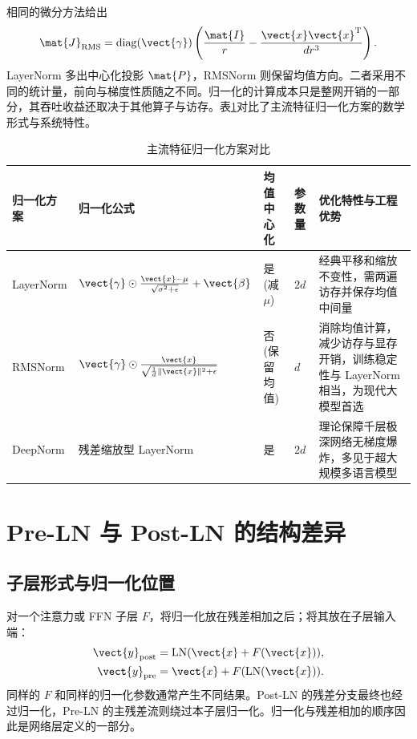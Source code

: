 \documentclass[../textbook.tex]{subfiles}
\begin{document}
相同的微分方法给出
\begin{equation}
 \mat{J}_{\mathrm{RMS}}=\operatorname{diag}(\vect{\gamma})
 \left(\frac{\mat{I}}r-\frac{\vect{x}\vect{x}^{\mathrm{T}}}{dr^3}\right).
\end{equation}
LayerNorm 多出中心化投影 $\mat{P}$，RMSNorm 则保留均值方向。二者采用不同的统计量，前向与梯度性质随之不同。归一化的计算成本只是整网开销的一部分，其吞吐收益还取决于其他算子与访存。表\ref{tab:norm-comparison}对比了主流特征归一化方案的数学形式与系统特性。

\begin{table}[htbp]
\centering
\caption{主流特征归一化方案对比}\label{tab:norm-comparison}
\begin{tabularx}{\linewidth}{p{20mm}p{32mm}p{16mm}p{16mm}X}
\toprule
归一化方案 & 归一化公式 & 均值中心化 & 参数量 & 优化特性与工程优势 \\\midrule
LayerNorm & $\vect{\gamma}\odot\frac{\vect{x}-\mu}{\sqrt{\sigma^2+\epsilon}}+\vect{\beta}$ & 是 (减 $\mu$) & $2d$ & 经典平移和缩放不变性，需两遍访存并保存均值中间量 \\
RMSNorm & $\vect{\gamma}\odot\frac{\vect{x}}{\sqrt{\frac{1}{d}\|\vect{x}\|^2+\epsilon}}$ & 否 (保留均值) & $d$ & 消除均值计算，减少访存与显存开销，训练稳定性与 LayerNorm 相当，为现代大模型首选 \\
DeepNorm & 残差缩放型 LayerNorm & 是 & $2d$ & 理论保障千层极深网络无梯度爆炸，多见于超大规模多语言模型 \\
\bottomrule
\end{tabularx}
\end{table}

\section{Pre-LN 与 Post-LN 的结构差异}

\subsection{子层形式与归一化位置}
对一个注意力或 FFN 子层 $F$，将归一化放在残差相加之后；将其放在子层输入端：
\begin{align}
 \vect{y}_{\mathrm{post}}&=\operatorname{LN}(\vect{x}+F(\vect{x})),\\
 \vect{y}_{\mathrm{pre}}&=\vect{x}+F(\operatorname{LN}(\vect{x})).
\end{align}
同样的 $F$ 和同样的归一化参数通常产生不同结果。Post-LN 的残差分支最终也经过归一化，Pre-LN 的主残差流则绕过本子层归一化。归一化与残差相加的顺序因此是网络层定义的一部分。
\end{document}
